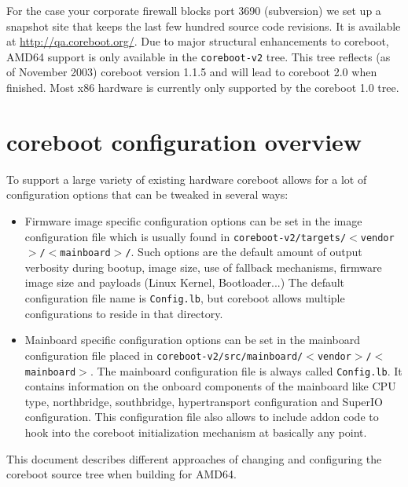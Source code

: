 \documentclass[titlepage,12pt]{article}
\begin{document}
For the case your corporate firewall blocks port 3690 (subversion) we set up a
snapshot site that keeps the last few hundred source code revisions. It
is available at \url{http://qa.coreboot.org/}.
Due to major structural enhancements to \hbox{coreboot}, AMD64 support
is only available in the \texttt{coreboot-v2} tree. This tree reflects (as
of November 2003) coreboot version 1.1.5 and will lead to coreboot 2.0
when finished.  Most x86 hardware is currently only supported by the 
coreboot 1.0 tree.

%
%

\section{coreboot configuration overview}
To support a large variety of existing hardware coreboot allows for a
lot of configuration options that can be tweaked in several ways:

\begin{itemize}
\item 
Firmware image specific configuration options can be set in the image
configuration file which is usually found in
\texttt{coreboot-v2/targets/$<$vendor$>$/$<$mainboard$>$/}.  Such
options are the default amount of output verbosity during bootup, image
size, use of fallback mechanisms, firmware image size and payloads
(Linux Kernel, Bootloader...) The default configuration file name is
\texttt{Config.lb}, but coreboot allows multiple configurations to
reside in that directory.

\item Mainboard specific configuration options can be set in the
mainboard configuration file placed in
\texttt{coreboot-v2/src/mainboard/$<$vendor$>$/$<$mainboard$>$}. The
mainboard configuration file is always called \texttt{Config.lb}. It
contains information on the onboard components of the mainboard like
CPU type, northbridge, southbridge, hypertransport configuration and
SuperIO configuration.  This configuration file also allows to include
addon code to hook into the coreboot initialization mechanism at
basically any point.

\end{itemize}

This document describes different approaches of changing and configuring the
coreboot source tree when building for AMD64.

%
%
\end{document}
